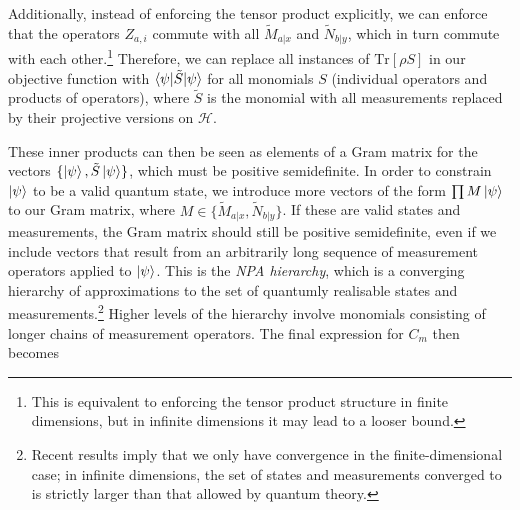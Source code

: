 \documentclass[10pt, a4paper]{article}
\numberwithin{equation}{section} %
\theoremstyle{definition}
\theoremstyle{plain}
\newcommand{\?}{\mathrel{?}} %
\newcommand{\Tr}{\mathrm{Tr}} %
\newcommand{\Hs}{\mathcal{H}} %
\begin{document}
      Additionally, instead of enforcing the tensor product explicitly, we can enforce that the operators \(Z_{a,i}\) commute with all \(\tilde{M}_{a|x}\) and \(\tilde{N}_{b|y}\), which in turn commute with each other.\footnote{This is equivalent to enforcing the tensor product structure in finite dimensions, but in infinite dimensions it may lead to a looser bound.} Therefore, we can replace all instances of \(\Tr\left[\rho S\right]\) in our objective function with \(\braket{\psi|\tilde{S}|\psi}\) for all monomials \(S\) (individual operators and products of operators), where \(\tilde{S}\) is the monomial with all measurements replaced by their projective versions on \(\Hs\). 

      These inner products can then be seen as elements of a Gram matrix for the vectors \(\{\ket{\psi}, \tilde{S}\ket{\psi}\}\), which must be positive semidefinite. In order to constrain \(\ket{\psi}\) to be a valid quantum state, we introduce more vectors of the form \(\prod M\ket{\psi}\) to our Gram matrix, where \(M \in \{\tilde{M}_{a|x}, \tilde{N}_{b|y}\}\). If these are valid states and measurements, the Gram matrix should still be positive semidefinite, even if we include vectors that result from an arbitrarily long sequence of measurement operators applied to \(\ket{\psi}\). This is the \emph{NPA hierarchy}, which is a converging hierarchy of approximations to the set of quantumly realisable states and measurements.\footnote{Recent results imply that we only have convergence in the finite-dimensional case; in infinite dimensions, the set of states and measurements converged to is strictly larger than that allowed by quantum theory.} Higher levels of the hierarchy involve monomials consisting of longer chains of measurement operators. The final expression for \(C_m\) then becomes
\end{document}
